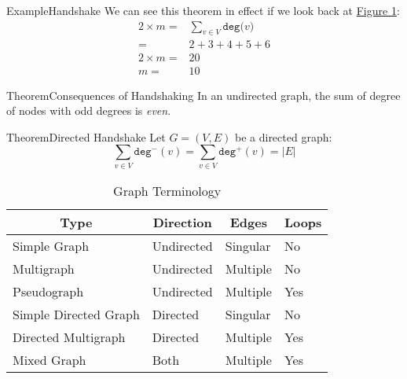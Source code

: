\documentclass{MathNotes}
\newenvironment{example}[1]{\begin{BlueBox}{Example}{#1}}{\end{BlueBox}}
\newenvironment{theorem}[1]{\begin{GrayBox}{Theorem}{#1}}{\end{GrayBox}}
\begin{document}
\begin{example}{Handshake}\label{ex:handshake}
	We can see this theorem in effect if we look back at
	\hyperref[fig:neighborhoods]{Figure 1}:
	\begin{align*}
		2\times m = & \sum_{v\in V}\texttt{deg($v$)} \\
		=           & 2 + 3 + 4 + 5 + 6              \\
		2\times m = & 20                             \\
		m =         & 10
	\end{align*}
\end{example}

\begin{multicols}{2}
	\begin{theorem}{Consequences of Handshaking}\label{th:handshake-consequence}
		In an undirected graph, the  sum of degree of nodes with odd degrees is
		\textit{even}.
	\end{theorem}
	\begin{theorem}{Directed Handshake}\label{th:handshake-directed}
		Let $G=(V,E)$ be a directed graph:
		\[\sum_{v\in V}\texttt{deg}^-(v)=\sum_{v\in V}\texttt{deg}^+(v)=|E|\]
	\end{theorem}
\end{multicols}
\newpage
\begin{table}[h!]\label{tab:graph-terminology}
	\centering
	\caption{Graph Terminology}
	\begin{tabular}{llll}
		\multicolumn{1}{c}{\textbf{Type}}      &
		\multicolumn{1}{c}{\textbf{Direction}} &
		\multicolumn{1}{c}{\textbf{Edges}}     &
		\multicolumn{1}{c}{\textbf{Loops}}                                   \\
		\midrule
		Simple Graph                           & Undirected & Singular & No  \\
		Multigraph                             & Undirected & Multiple & No  \\
		Pseudograph                            & Undirected & Multiple & Yes \\
		Simple Directed Graph                  & Directed   & Singular & No  \\
		Directed Multigraph                    & Directed   & Multiple & Yes \\
		Mixed Graph                            & Both       & Multiple & Yes \\
	\end{tabular}
\end{table}
\end{document}
